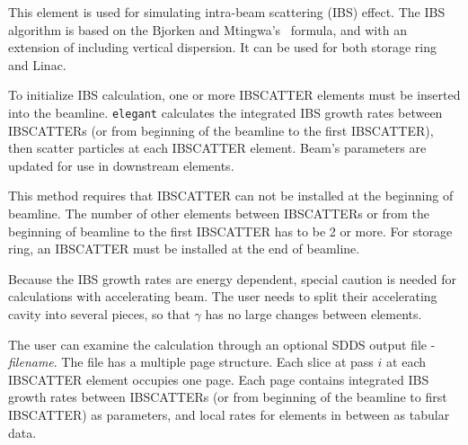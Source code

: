 This element is used for simulating intra-beam scattering
(IBS) effect. The IBS algorithm is based on the Bjorken and
Mtingwa's~\cite{BM} formula, and with an extension of including
vertical dispersion. It can be used for both storage ring and Linac.

To initialize IBS calculation, one or more IBSCATTER elements must be
inserted into the beamline. {\tt elegant} calculates the integrated
IBS growth rates between IBSCATTERs (or from beginning of the beamline
to the first IBSCATTER), then scatter particles at each IBSCATTER
element. Beam's parameters are updated for use in downstream elements.

This method requires that IBSCATTER can not be installed at the beginning
of beamline. The number of other elements between IBSCATTERs or from the beginning of
beamline to the first IBSCATTER has to be 2 or more. For storage ring, an
IBSCATTER must be installed at the end of beamline.

Because the IBS growth rates are energy dependent, special caution is
needed for calculations with accelerating beam. The user needs to
split their accelerating cavity into several pieces, so that $\gamma$
has no large changes between elements.

The user can examine the calculation through an optional SDDS output
file - {\it filename}. The file has a multiple page structure. Each
slice at pass $i$ at each IBSCATTER element occupies one page. Each
page contains integrated IBS growth rates between IBSCATTERs (or from
beginning of the beamline to first IBSCATTER) as parameters, and local
rates for elements in between as tabular data.
